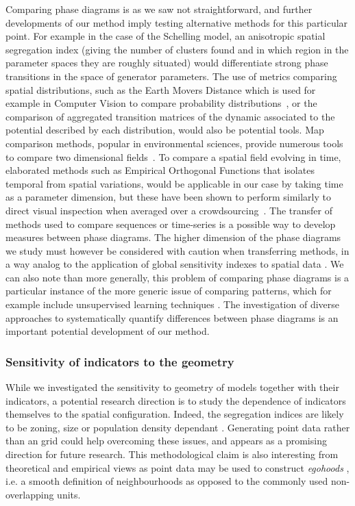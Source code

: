 \documentclass{JASSS}
\begin{document}
Comparing phase diagrams is as we saw not straightforward, and further developments of our method imply testing alternative methods for this particular point. For example in the case of the Schelling model, an anisotropic spatial segregation index (giving the number of clusters found and in which region in the parameter spaces they are roughly situated) would differentiate strong phase transitions in the space of generator parameters. The use of metrics comparing spatial distributions, such as the Earth Movers Distance which is used for example in Computer Vision to compare probability distributions~\citep{rubner2000earth}, or the comparison of aggregated transition matrices of the dynamic associated to the potential described by each distribution, would also be potential tools. Map comparison methods, popular in environmental sciences, provide numerous tools to compare two dimensional fields~\citep{visser2006map,kuhnert2005comparing}. To compare a spatial field evolving in time, elaborated methods such as Empirical Orthogonal Functions that isolates temporal from spatial variations, would be applicable in our case by taking time as a parameter dimension, but these have been shown to perform similarly to direct visual inspection when averaged over a crowdsourcing~\citep{10.1371/journal.pone.0178165}. The transfer of methods used to compare sequences \citep{kruskal1983overview} or time-series \citep{liao2005clustering} is a possible way to develop measures between phase diagrams. The higher dimension of the phase diagrams we study must however be considered with caution when transferring methods, in a way analog to the application of global sensitivity indexes to spatial data \citep{lilburne2009sensitivity}. We can also note than more generally, this problem of comparing phase diagrams is a particular instance of the more generic issue of comparing patterns, which for example include unsupervised learning techniques \citep{hastie2009unsupervised}. The investigation of diverse approaches to systematically quantify differences between phase diagrams is an important potential development of our method.

\subsubsection{Sensitivity of indicators to the geometry}

While we investigated the sensitivity to geometry of models together with their indicators, a potential research direction is to study the dependence of indicators themselves to the spatial configuration. Indeed, the segregation indices are likely to be zoning, size or population density dependant \citep{Wong1997,ReardonOSullivan2004}. Generating point data rather than an grid could help overcoming these issues, and appears as a promising direction for future research. This methodological claim is also interesting from theoretical and empirical views as point data may be used to construct \textit{egohoods} \citep{Hippetal2013}, i.e. a smooth definition of neighbourhoods as opposed to the commonly used non-overlapping units. 
\end{document}
